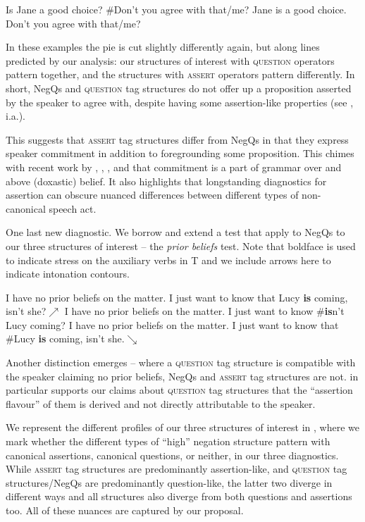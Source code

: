 \documentclass[output=paper,colorlinks,citecolor=brown]{langscibook}
\begin{document}
\ea	 Is Jane a good choice? {\#}Don't you agree with that/me?
\ex	 Jane is a good choice. Don't you agree with that/me?
\z

In these examples the pie is cut slightly differently again, but along lines predicted by our analysis: our structures of interest with \textsc{question} operators pattern together, and the structures with \textsc{assert} operators pattern differently. In short, NegQs and \textsc{question} tag structures do not offer up a proposition asserted by the speaker to agree with, despite having some assertion-like properties (see \citealt{sadock1971,sadock1974,asherreese2007}, i.a.). 

This suggests that \textsc{assert} tag structures differ from NegQs in that they express speaker commitment in addition to foregrounding some proposition. This chimes with recent work by \citet{ceong2019}, \citet{krifka2014, krifka2021}, \citet{wiltschkoheim2016, wiltheim2021}, \citet{woods2021please} and \citet{woods2021why} that commitment is a part of grammar over and above (doxastic) belief. It also highlights that longstanding diagnostics for assertion can obscure nuanced differences between different types of non-canonical speech act. 

One last new diagnostic. We borrow and extend a test that \citet[10]{asherreese2007} apply to NegQs to our three structures of interest – the \textit{prior beliefs} test. Note that boldface is used to indicate stress on the auxiliary verbs in T and we include arrows here to indicate intonation contours.

\ea	 I have no prior beliefs on the matter. I just want to know that Lucy \textbf{is} coming, isn't she?$\nearrow$ \label{prior:qtag}
\ex	 I have no prior beliefs on the matter. I just want to know {\#}\textbf{is}n't Lucy coming?
\ex	 I have no prior beliefs on the matter. I just want to know that {\#}Lucy \textbf{is} coming, isn't she.$\searrow$
\z

Another distinction emerges – where a \textsc{question} tag structure is compatible with the speaker claiming no prior beliefs, NegQs and \textsc{assert} tag structures are not.  in particular supports our claims about \textsc{question} tag structures that the ``assertion flavour'' of them is derived and not directly attributable to the speaker.

We represent the different profiles of our three structures of interest in , where we mark whether the different types of ``high'' negation structure pattern with canonical assertions, canonical questions, or neither, in our three diagnostics. While \textsc{assert} tag structures are predominantly assertion-like, and \textsc{question} tag structures/NegQs are predominantly question-like, the latter two diverge in different ways and all structures also diverge from both questions and assertions too. All of these nuances are captured by our proposal.
\end{document}
